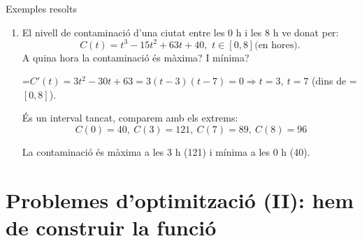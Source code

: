 \documentclass[11pt,a4paper]{article}
\newcommand{\fmm}[1]{\setbox0=\hbox{$#1$}\ifdim\wd0>\linewidth\[#1\]\else\mbox{\box0}\fi}
\begin{document}
\begin{fmex}{Exemples resolts}
\begin{enumerate}[label=\textbf{\arabic*.},leftmargin=*]
            

\fmm{CM'(x)=1-\dfrac{400}{x^2}=0\Rightarrow x^2=400\Rightarrow x=20}

            

\fmm{CM''(x)=\dfrac{800}{x^3}\Rightarrow CM''(20)\gt0}: mínim. \fmm{\ CM(20)=20+10+20=50}. Fabricant 20 unitats, el cost mitjà és mínim: 50 € per unitat.
\item El nivell de contaminació d'una ciutat entre les 0 h i les 8 h ve donat per: \[C(t)=t^3-15t^2+63t+40,\,\, t\in[0,8] \text{(en hores)}.\] A quina hora la contaminació és màxima? I mínima?
          

            

\fmm{C'(t)=3t^2-30t+63=3(t-3)(t-7)=0\Rightarrow t=3,\ t=7} (dins de \fmm{[0,8]}).

            

És un interval tancat, comparem amb els extrems:\[\ C(0)=40,\ C(3)=121,\ C(7)=89,\ C(8)=96\]

            

La contaminació és màxima a les 3 h (121) i mínima a les 0 h (40).
\end{enumerate}
\end{fmex}

  
\section{Problemes d'optimització (II): hem de construir la funció}\hypertarget{sec7}{}

  
\end{document}
